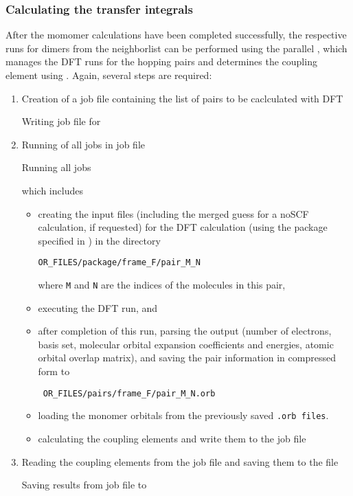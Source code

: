 \subsubsection{Calculating the transfer integrals}
\label{sec:idft}
After the momomer calculations have been completed successfully, the respective runs for dimers from the neighborlist can be performed using the parallel  \calculator, which manages the DFT runs for the hopping pairs and determines the coupling element using \dipro. Again, several steps are required:
\begin{enumerate}
\item Creation of a job file containing the list of pairs to be caclculated with DFT 
\begin{bclogo}[couleur=bgblue, arrondi =0 , logo=\votcalogo, barre=line,noborder=true]{\small Writing job file for }
\itshape {\small \ctpparallel \opt \xmloptions \sql \sqlstate \exe {} \job \wrt }
\end{bclogo}
\item Running of all jobs in job file 
\begin{bclogo}[couleur=bgblue, arrondi =0 , logo=\votcalogo, barre=line,noborder=true]{\small Running all  jobs}
\itshape {\small \ctpparallel \opt \xmloptions \sql \sqlstate \exe {} \job \run }
\end{bclogo}
which includes
\begin{itemize}
\item creating the input files (including the merged guess for a noSCF calculation, if requested) for the DFT calculation (using the package specified in \xmloptions) in the directory 
\begin{verbatim}
OR_FILES/package/frame_F/pair_M_N
\end{verbatim}
where {\tt M} and {\tt N} are the indices of the molecules in this pair,
\item executing the DFT run, and
\item after completion of this run, parsing the output (number of electrons, basis set, molecular orbital expansion coefficients and energies, atomic orbital overlap matrix), and saving the pair information in compressed form to
\begin{verbatim}
 OR_FILES/pairs/frame_F/pair_M_N.orb 
\end{verbatim}
\item loading the monomer orbitals from the previously saved {\tt *.orb files}.
\item calculating the coupling elements and write them to the job file
\end{itemize}
\item Reading the coupling elements from the job file and saving them to the \sqlstate file
\begin{bclogo}[couleur=bgblue, arrondi =0 , logo=\votcalogo, barre=line,noborder=true]{\small Saving  results from job file to \sqlstate}
\itshape {\small \ctpparallel \opt \xmloptions \sql \sqlstate \exe {} \job \rd }
\end{bclogo}
\end{enumerate}




